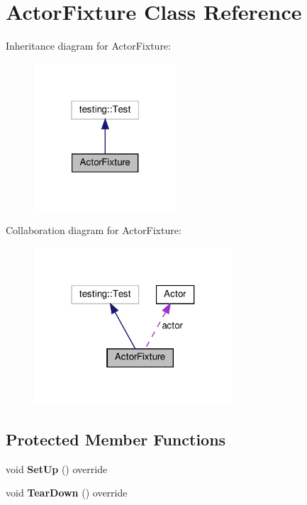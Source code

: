 \hypertarget{classActorFixture}{}\section{Actor\+Fixture Class Reference}
\label{classActorFixture}


Inheritance diagram for Actor\+Fixture\+:\nopagebreak
\begin{figure}[H]
\begin{center}
\leavevmode
\includegraphics[width=151pt]{classActorFixture__inherit__graph}
\end{center}
\end{figure}


Collaboration diagram for Actor\+Fixture\+:\nopagebreak
\begin{figure}[H]
\begin{center}
\leavevmode
\includegraphics[width=210pt]{classActorFixture__coll__graph}
\end{center}
\end{figure}
\subsection*{Protected Member Functions}
\begin{DoxyCompactItemize}
\item 
\mbox{\label{classActorFixture_a37b8fac9aa3fbbe7e3c49b08d1c71274}} 
void {\bfseries Set\+Up} () override
\item 
\mbox{\label{classActorFixture_af8794b3ca52e476531ee1527b86557d3}} 
void {\bfseries Tear\+Down} () override
\end{DoxyCompactItemize}
